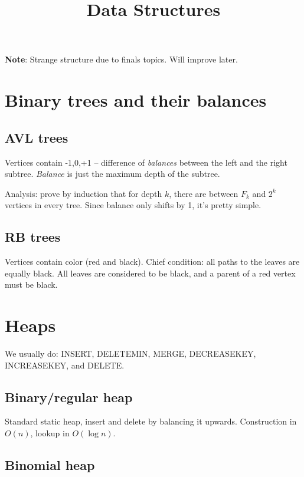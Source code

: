 

\def\len{{\rm len}}


\title{Data Structures}

{\bf Note}: Strange structure due to finals topics.
Will improve later.

\section{Binary trees and their balances}

\subsection{AVL trees}

Vertices contain {-1,0,+1} -- difference of {\it balances} between the left
and the right subtree. {\it Balance} is just the maximum depth of the subtree.

Analysis: prove by induction that for depth $k$, there are between $F_k$ and $2^k$
vertices in every tree. Since balance only shifts by 1, it's pretty simple.

\subsection{RB trees}

Vertices contain color (red and black). Chief condition: all paths to the leaves
are equally black. All leaves are considered to be black, and a parent of a red
vertex must be black.



\section{Heaps}

We usually do: INSERT, DELETEMIN, MERGE, DECREASEKEY, INCREASEKEY, and DELETE.

\subsection{Binary/regular heap}

Standard static heap, insert and delete by balancing it upwards.
Construction in $O(n)$, lookup in $O(\log n)$.

\subsection{Binomial heap}

